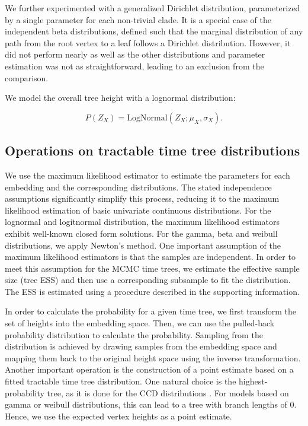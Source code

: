 \documentclass[10pt,letterpaper]{article}
\begin{document}
We further experimented with a generalized Dirichlet distribution, parameterized by a single parameter for each non-trivial clade. It is a special case of the independent beta distributions, defined such that the marginal distribution of any path from the root vertex to a leaf follows a Dirichlet distribution. However, it did not perform nearly as well as the other distributions and parameter estimation was not as straightforward, leading to an exclusion from the comparison.

We model the overall tree height with a lognormal distribution:

$$
P(Z_X) = \text{LogNormal}(Z_X; \mu_X, \sigma_X).
$$

\subsection*{Operations on tractable time tree distributions}

We use the maximum likelihood estimator to estimate the parameters for each embedding and the corresponding distributions. The stated independence assumptions significantly simplify this process, reducing it to the maximum likelihood estimation of basic univariate continuous distributions. For the lognormal and logitnormal distribution, the maximum likelihood estimators exhibit well-known closed form solutions. For the gamma, beta and weibull distributions, we apply Newton's method. One important assumption of the maximum likelihood estimators is that the samples are independent. In order to meet this assumption for the MCMC time trees, we estimate the effective sample size (tree ESS) and then use a corresponding subsample to fit the distribution. The ESS is estimated using a procedure described in the supporting information.

In order to calculate the probability for a given time tree, we first transform the set of heights into the embedding space. Then, we can use the pulled-back probability distribution to calculate the probability. Sampling from the distribution is achieved by drawing samples from the embedding space and mapping them back to the original height space using the inverse transformation. Another important operation is the construction of a point estimate based on a fitted tractable time tree distribution. One natural choice is the highest-probability tree, as it is done for the CCD distributions \cite{ccd}. For models based on gamma or weibull distributions, this can lead to a tree with branch lengths of $0$. Hence, we use the expected vertex heights as a point estimate.
\end{document}
